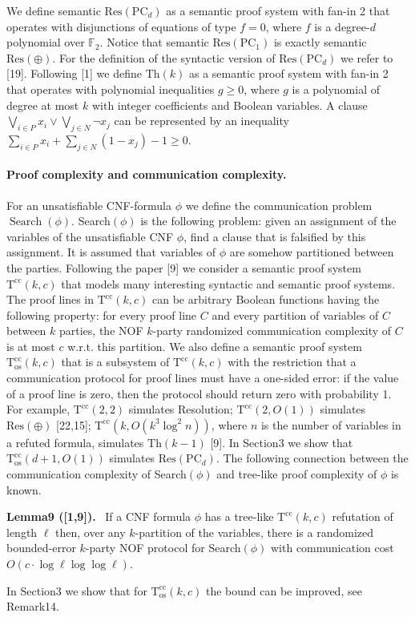 \documentclass[10pt,a4paper]{article}
\newenvironment{authorclaim}[1]{\par\medskip\noindent\textbf{#1.}\ \ignorespaces}{\par\medskip}
\begin{document}
We define semantic $\mathrm{Res}(\mathrm{PC}_d)$ as a semantic proof system with fan-in 2 that operates with disjunctions of equations of type $f=0$, where $f$ is a degree-$d$ polynomial over $\mathbb F_2$. Notice that semantic $\mathrm{Res}(\mathrm{PC}_1)$ is exactly semantic $\mathrm{Res}(\oplus)$. For the definition of the syntactic version of $\mathrm{Res}(\mathrm{PC}_d)$ we refer to [19].
Following [1] we define $\mathrm{Th}(k)$ as a semantic proof system with fan-in 2 that operates with polynomial inequalities $g\ge0$, where $g$ is a polynomial of degree at most $k$ with integer coefficients and Boolean variables. A clause $\bigvee_{i\in P}x_i\vee\bigvee_{j\in N}\neg x_j$ can be represented by an inequality $\sum_{i\in P}x_i+\sum_{j\in N}(1-x_j)-1\ge0$.
\paragraph{Proof complexity and communication complexity.} For an unsatisfiable CNF-formula $\phi$ we define the communication problem $\operatorname{Search}(\phi)$. Search$(\phi)$ is the following problem: given an assignment of the variables of the unsatisfiable CNF $\phi$, find a clause that is falsified by this assignment. It is assumed that variables of $\phi$ are somehow partitioned between the parties.
Following the paper [9] we consider a semantic proof system $\mathrm T^{\mathrm{cc}}(k,c)$ that models many interesting syntactic and semantic proof systems. The proof lines in $\mathrm T^{\mathrm{cc}}(k,c)$ can be arbitrary Boolean functions having the following property: for every proof line $C$ and every partition of variables of $C$ between $k$ parties, the NOF $k$-party randomized communication complexity of $C$ is at most $c$ w.r.t. this partition. We also define a semantic proof system $\mathrm T^{\mathrm{cc}}_{\mathrm{os}}(k,c)$ that is a subsystem of $\mathrm T^{\mathrm{cc}}(k,c)$ with the restriction that a communication protocol for proof lines must have a one-sided error: if the value of a proof line is zero, then the protocol should return zero with probability 1.
For example, $\mathrm T^{\mathrm{cc}}(2,2)$ simulates Resolution; $\mathrm T^{\mathrm{cc}}(2,O(1))$ simulates $\mathrm{Res}(\oplus)$ [22,15]; $\mathrm T^{\mathrm{cc}}(k,O(k^3\log^2n))$, where $n$ is the number of variables in a refuted formula, simulates $\mathrm{Th}(k-1)$ [9]. In Section3 we show that $\mathrm T^{\mathrm{cc}}_{\mathrm{os}}(d+1,O(1))$ simulates $\mathrm{Res}(\mathrm{PC}_d)$.
The following connection between the communication complexity of Search$(\phi)$ and tree-like proof complexity of $\phi$ is known.
\begin{authorclaim}{Lemma9 ([1,9])}
If a CNF formula $\phi$ has a tree-like $\mathrm T^{\mathrm{cc}}(k,c)$ refutation of length $\ell$ then, over any $k$-partition of the variables, there is a randomized bounded-error $k$-party NOF protocol for Search$(\phi)$ with communication cost $O(c\cdot\log\ell\log\log\ell)$.
\end{authorclaim}
In Section3 we show that for $\mathrm T^{\mathrm{cc}}_{\mathrm{os}}(k,c)$ the bound can be improved, see Remark14.
\end{document}
